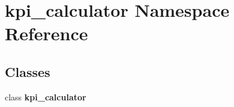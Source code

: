 \section{kpi\+\_\+calculator Namespace Reference}
\label{namespacekpi__calculator}
\subsection*{Classes}
\begin{DoxyCompactItemize}
\item 
class \textbf{ kpi\+\_\+calculator}
\end{DoxyCompactItemize}
